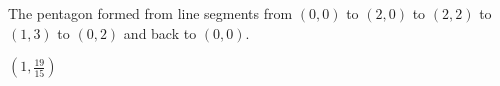 {The pentagon formed from line segments from $(0,0)$ to $(2,0)$ to $(2,2)$ to $(1,3)$ to $(0,2)$ and back to $(0,0)$.\\

\noindent\begin{minipage}{\linewidth}
\centering
{}
\end{minipage}
}
{$\left(1,\frac{19}{15}\right)$
}
